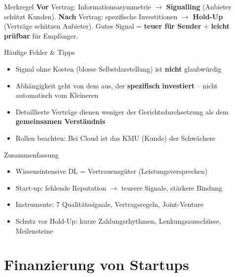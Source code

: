 \documentclass[a4paper, fontsize=7pt]{scrartcl}
\begin{document}
\begin{subbox}{Merkregel}
\textbf{Vor} Vertrag: Informationsasymmetrie $\to$ \textbf{Signalling}
(Anbieter schützt Kunden). \textbf{Nach} Vertrag: spezifische
Investitionen $\to$ \textbf{Hold-Up} (Verträge schützen Anbieter).
Gutes Signal = \textbf{teuer für Sender} + \textbf{leicht prüfbar} für
Empfänger.
\end{subbox}

\begin{subbox}{Häufige Fehler \& Tipps}
\begin{itemize}
    \item Signal ohne Kosten (blosse Selbstdarstellung) ist
    \textbf{nicht} glaubwürdig
    \item Abhängigkeit geht von dem aus, der \textbf{spezifisch investiert}
    -- nicht automatisch vom Kleineren
    \item Detaillierte Verträge dienen weniger der Gerichtsdurchsetzung
    als dem \textbf{gemeinsamen Verständnis}
    \item Rollen beachten: Bei Cloud ist das KMU (Kunde) der Schwächere
\end{itemize}
\end{subbox}

\begin{subbox}{Zusammenfassung}
\begin{itemize}
    \item Wissensintensive DL = Vertrauensgüter (Leistungsversprechen)
    \item Start-up: fehlende Reputation $\to$ teurere Signale, stärkere
    Bindung
    \item Instrumente: 7 Qualitätssignale, Vertragsregeln, Joint-Venture
    \item Schutz vor Hold-Up: kurze Zahlungsrhythmen, Lenkungsausschüsse,
    Meilensteine
\end{itemize}
\end{subbox}

\section{Finanzierung von Startups}
\end{document}
